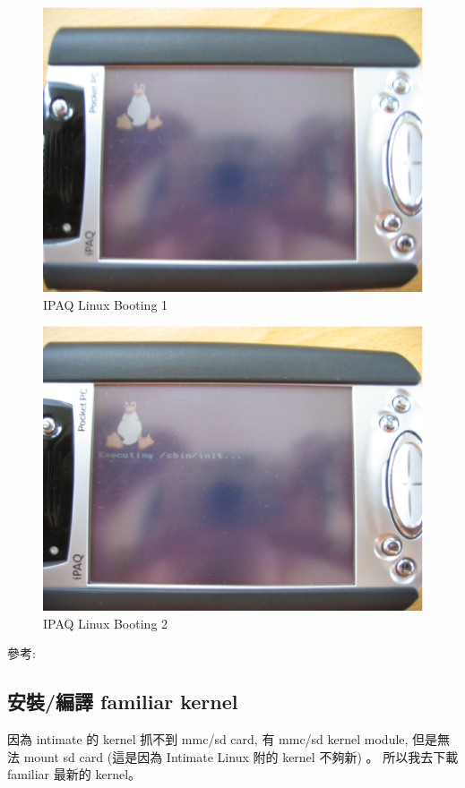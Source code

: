\documentclass[12pt,a4paper]{article}
\begin{document}
\begin{CJK}{UTF8}{cwmu}
\begin{figure}[htbp]
\centering
\includegraphics[scale=0.5]{eps/booting_1.eps}
\caption{IPAQ Linux Booting 1}
\end{figure}

\begin{figure}[htbp]
\centering
\includegraphics[scale=0.5]{eps/booting_2.eps}
\caption{IPAQ Linux Booting 2}
\end{figure}

參考: \cite{intimate}

\subsection{安裝/編譯 familiar kernel}
因為 intimate 的 kernel 抓不到 mmc/sd card, 有 mmc/sd kernel module,
但是無法 mount sd card (這是因為 Intimate Linux 附的 kernel 不夠新) 。
所以我去下載 familiar 最新的 kernel。


\end{CJK}
\end{document}
